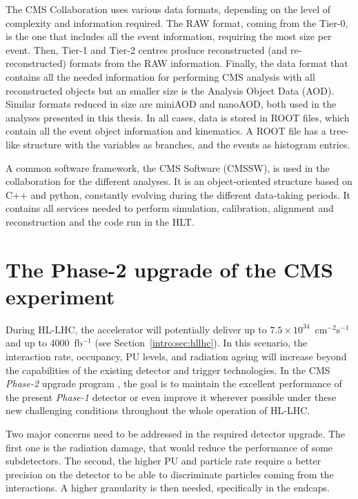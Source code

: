 \documentclass[../main.tex]{subfiles}
\begin{document}
The CMS Collaboration uses various data formats, depending on the level of complexity and information required. The RAW format, coming from the Tier-0, is the one that includes all the event information, requiring the most size per event. Then, Tier-1 and Tier-2 centres produce reconstructed (and re-reconstructed) formats from the RAW information. Finally, the data format that contains all the needed information for performing CMS analysis with all reconstructed objects but an smaller size is the Analysis Object Data (AOD). Similar formats reduced in size are miniAOD and nanoAOD, both used in the analyses presented in this thesis. In all cases, data is stored in ROOT \cite{intro:exp:root} files, which contain all the event object information and kinematics. A ROOT file has a tree-like structure with the variables as branches, and the events as histogram entries.

A common software framework, the CMS Software (CMSSW), is used in the collaboration for the different analyses. It is an object-oriented structure based on C++ and python, constantly evolving during the different data-taking periods. It contains all services needed to perform simulation, calibration, alignment and reconstruction and the code run in the HLT. 




\section{The Phase-2 upgrade of the CMS experiment}

During HL-LHC, the accelerator will potentially deliver up to $7.5\times10^{34}$~cm${}^{-2}$s${}^{-1}$ and up to 4000~fb${}^{-1}$ (see Section~\ref{intro:sec:hllhc}). In this scenario, the interaction rate, occupancy, PU levels, and radiation ageing will increase beyond the capabilities of the existing detector and trigger technologies. In the CMS \textit{Phase-2} upgrade program \cite{intro:exp:phase2_upgrade}, the goal is to maintain the excellent performance of the present \textit{Phase-1} detector or even improve it wherever possible under these new challenging conditions throughout the whole operation of HL-LHC.

Two major concerns need to be addressed in the required detector upgrade. The first one is the radiation damage, that would reduce the performance of some subdetectors. The second, the higher PU and particle rate require a better precision on the detector to be able to discriminate particles coming from the interactions. A higher granularity is then needed, specifically in the endcaps. 
\end{document}

